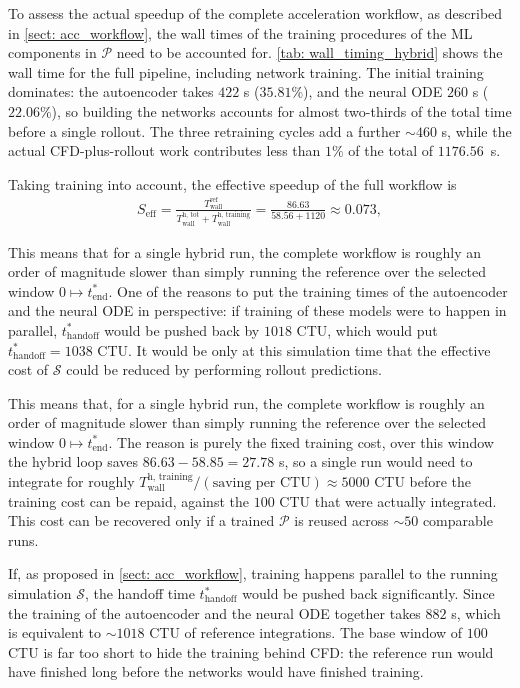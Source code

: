 To assess the actual speedup of the complete acceleration workflow, as described in \autoref{sect: acc_workflow}, the wall times of the training procedures of the ML components in $\mathcal{P}$ need to be accounted for. \autoref{tab: wall_timing_hybrid} shows the wall time for the full pipeline, including network training. The initial training dominates: the autoencoder takes $422$ s ($35.81\%$), and the neural ODE $260$ s ($22.06\%$), so building the networks accounts for almost two-thirds of the total time before a single rollout. The three retraining cycles add a further ${\sim}460$ s, while the actual CFD-plus-rollout work contributes less than $1\%$ of the total of $1176.56$~s.


Taking training into account, the effective speedup of the full workflow is
\begin{align}
    S_\text{eff}
    = \frac{T_\text{wall}^\text{ref}}{T_\text{wall}^\text{h, tot} + T_\text{wall}^\text{h, training}}
    = \frac{86.63}{58.56 + 1120}
    \approx 0.073,
\end{align}

This means that for a single hybrid run, the complete workflow is roughly an order of magnitude slower than simply running the reference over the selected window $0 \mapsto t^*_\text{end}$. One of the reasons to put the training times of the autoencoder and the neural ODE in perspective: if training of these models were to happen in parallel, $t^*_\text{handoff}$ would be pushed back by $1018$ CTU, which would put $t^*_\text{handoff}=1038$ CTU. It would be only at this simulation time that the effective cost of $\mathcal{S}$ could be reduced by performing rollout predictions.  

This means that, for a single hybrid run, the complete workflow is roughly an order of magnitude slower than simply running the reference over the selected window $0 \mapsto t^*_\text{end}$. The reason is purely the fixed training cost, over this window the hybrid loop saves $86.63 - 58.85 = 27.78$ s, so a single run would need to integrate for roughly $T_\text{wall}^\text{h, training} / (\text{saving per CTU}) \approx 5000$ CTU before the training cost can be repaid, against the $100$ CTU that were actually integrated. This cost can be recovered only if a trained $\mathcal{P}$ is reused across ${\sim} 50$ comparable runs.

If, as proposed in \autoref{sect: acc_workflow}, training happens parallel to the running simulation $\mathcal{S}$, the handoff time $t^*_\text{handoff}$ would be pushed back significantly. Since the training of the autoencoder and the neural ODE together takes $882$ s, which is equivalent to ${\sim}1018$ CTU of reference integrations. The base window of $100$ CTU is far too short to hide the training behind CFD: the reference run would have finished long before the networks would have finished training.

